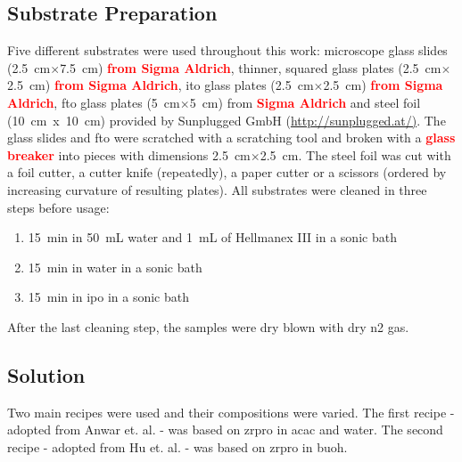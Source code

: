 \documentclass[a4paper]{article}
\newcommand{\td}[1]{\textbf{\textcolor{red}{#1}}}
\newcommand{\ds}[1]{}
\newcommand{\x}{$\times$}
\newcommand{\cm}[1]{\SI{#1}{\centi\meter}}
\newcommand{\ml}[1]{\SI{#1}{\milli\liter}}
\newcommand{\minutes}[1]{\SI{#1}{\minute}}
\begin{document}
\subsection{Substrate Preparation}
Five different substrates were used throughout this work: 
microscope glass slides (\cm{2.5}\x\cm{7.5}) \td{from Sigma Aldrich}, thinner, squared glass plates (\cm{2.5}\x\cm{2.5}) \td{from Sigma Aldrich}, \gls{ito} glass plates (\cm{2.5}\x\cm{2.5}) \td{from Sigma Aldrich}, \gls{fto} glass plates (\cm{5}\x\cm{5}) from \td{Sigma Aldrich} and steel foil (10~cm~x~10~cm) provided by Sunplugged GmbH (\url{http://sunplugged.at/)}.
The glass slides and \gls{fto} were \ds{cut\td{/scratched}}scratched with a scratching tool \ds{\td{(diamond scratcher/scraper)} }and broken with a \td{glass breaker} into pieces with dimensions \cm{2.5}\x\cm{2.5}.
The steel foil was cut with a foil cutter, a cutter knife (repeatedly), a paper cutter or a scissors (ordered by increasing curvature of resulting plates).
All substrates were cleaned in three steps before usage:
\begin{enumerate}
	\item \minutes{15} in \ml{50} \gls{water} and \ml{1} of Hellmanex III in a sonic bath
	\item \minutes{15} in \gls{water} in a sonic bath
	\item \minutes{15} in \gls{ipo} in a sonic bath 
\end{enumerate}
After the last cleaning step, the samples were dry blown with dry \gls{n2} gas. 

\subsection{Solution}
Two main recipes were used and their compositions were varied. 
The first recipe - adopted from Anwar et. al. \cite{Anwar2017} - was based on \gls{zrpro} in \gls{acac} and \gls{water}.
The second recipe - 
adopted from Hu et. al. \cite{Hu2016} -
was based on \gls{zrpro} in \gls{buoh}.
\end{document}
